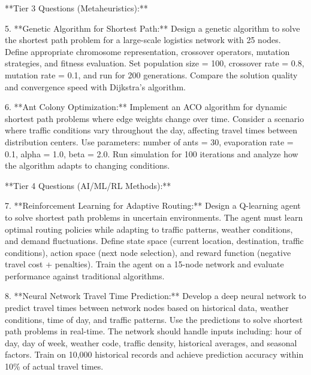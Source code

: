 \documentclass{article}
\begin{document}
**Tier 3 Questions (Metaheuristics):**

5. **Genetic Algorithm for Shortest Path:** Design a genetic algorithm to solve the shortest path problem for a large-scale logistics network with 25 nodes. Define appropriate chromosome representation, crossover operators, mutation strategies, and fitness evaluation. Set population size = 100, crossover rate = 0.8, mutation rate = 0.1, and run for 200 generations. Compare the solution quality and convergence speed with Dijkstra's algorithm.

6. **Ant Colony Optimization:** Implement an ACO algorithm for dynamic shortest path problems where edge weights change over time. Consider a scenario where traffic conditions vary throughout the day, affecting travel times between distribution centers. Use parameters: number of ants = 30, evaporation rate = 0.1, alpha = 1.0, beta = 2.0. Run simulation for 100 iterations and analyze how the algorithm adapts to changing conditions.

**Tier 4 Questions (AI/ML/RL Methods):**

7. **Reinforcement Learning for Adaptive Routing:** Design a Q-learning agent to solve shortest path problems in uncertain environments. The agent must learn optimal routing policies while adapting to traffic patterns, weather conditions, and demand fluctuations. Define state space (current location, destination, traffic conditions), action space (next node selection), and reward function (negative travel cost + penalties). Train the agent on a 15-node network and evaluate performance against traditional algorithms.

8. **Neural Network Travel Time Prediction:** Develop a deep neural network to predict travel times between network nodes based on historical data, weather conditions, time of day, and traffic patterns. Use the predictions to solve shortest path problems in real-time. The network should handle inputs including: hour of day, day of week, weather code, traffic density, historical averages, and seasonal factors. Train on 10,000 historical records and achieve prediction accuracy within 10\% of actual travel times.
\end{document}
